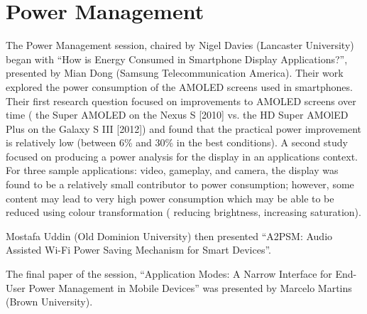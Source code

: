 \section{Power Management}
\label{sec:power}
The Power Management session, chaired by Nigel Davies (Lancaster University)
began with ``How is Energy Consumed in Smartphone Display Applications?'', 
presented by Mian Dong (Samsung Telecommunication America). Their work explored
the power consumption of the AMOLED screens used in smartphones. Their first 
research question focused on improvements to AMOLED screens over time (\eg{} the 
Super AMOLED on the Nexus S [2010] vs. the HD Super AMOlED Plus on the Galaxy S 
III [2012]) and found that the practical power improvement is relatively low 
(between 6\% and 30\% in the best conditions). A second study focused on 
producing a power analysis for the display in an applications context. For three 
sample applications: video, gameplay, and camera, the display was found to be a 
relatively small contributor to power consumption; however, some content may lead 
to very high power consumption which may be able to be reduced using colour 
transformation (\eg{} reducing brightness, increasing saturation).

Mostafa Uddin (Old Dominion University) then presented ``A2PSM: Audio Assisted 
Wi-Fi Power Saving Mechanism for Smart Devices''.

The final paper of the session, ``Application Modes: A Narrow Interface for End-
User Power Management in Mobile Devices'' was presented by Marcelo Martins (Brown 
University).